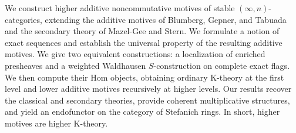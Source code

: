 We construct higher additive noncommutative motives of stable
$(\infty,n)$-categories, extending the additive motives of
Blumberg, Gepner, and Tabuada and the secondary theory of
Mazel-Gee and Stern.
We formulate
a notion of exact sequences and establish the universal
property of the resulting additive motives.
We give two equivalent constructions: a localization of
enriched presheaves and a weighted Waldhausen
$S$-construction on complete exact flags.
We then compute their Hom objects, obtaining ordinary
K-theory at the first level and lower additive motives
recursively at higher levels.
Our results recover the classical and secondary theories,
provide coherent multiplicative structures, and yield
an endofunctor on the category of Stefanich rings.
In short, higher motives are higher K-theory.
